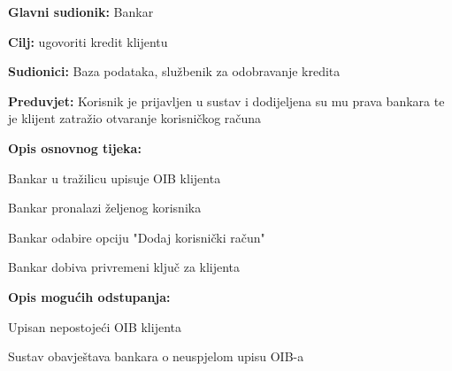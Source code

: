             	\begin{packed_item}
            		
            		\item \textbf{Glavni sudionik: }Bankar
            		\item  \textbf{Cilj:} ugovoriti kredit klijentu
            		\item  \textbf{Sudionici:} Baza podataka, službenik za odobravanje kredita
            		\item  \textbf{Preduvjet:} Korisnik je prijavljen u sustav i dodijeljena su mu prava bankara te je klijent zatražio otvaranje korisničkog računa
            		\item  \textbf{Opis osnovnog tijeka:}
            		
            		\item[] \begin{packed_enum}
            			
            			\item Bankar u tražilicu upisuje OIB klijenta
            			\item Bankar pronalazi željenog korisnika
            			\item Bankar odabire opciju "Dodaj korisnički račun"
            			\item Bankar dobiva privremeni ključ za klijenta
            		\end{packed_enum}
            		
            		\item  \textbf{Opis mogućih odstupanja:} 
            		
            		\item[] \begin{packed_item}
            			
            			\item[1.a] Upisan nepostojeći OIB klijenta
            			\item[] \begin{packed_enum}
            				
            				\item Sustav obavještava bankara o neuspjelom upisu OIB-a
            				
            			\end{packed_enum}
            			
            		\end{packed_item}
            	\end{packed_item}
            
